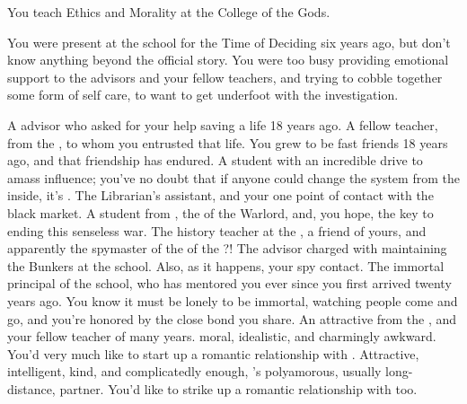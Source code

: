\documentclass[char]{GL2020}
\begin{document}
\begin{itemz}[Notes]
	\item You teach Ethics and Morality at the College of the Gods.
	\item You were present at the school for the Time of Deciding six years ago, but don't know anything beyond the official story. You were too busy providing emotional support to the advisors and your fellow teachers, and trying to cobble together some form of self care, to want to get underfoot with the investigation.
\end{itemz}

\begin{contacts}
	\contact{\cEvil{}} A \pFarm{} advisor who asked for your help saving a life 18 years ago.
\contact{\cPirate{}} A fellow teacher, from the \pShip{}, to whom you entrusted that life. You grew to be fast friends 18 years ago, and that friendship has endured.
\contact{\cAmbition{}} A \pTech{} student with an incredible drive to amass influence; you've no doubt that if anyone could change the system from the inside, it's \cAmbition{}.
	\contact{\cLibAssist{}} The Librarian's assistant, and your one point of contact with the black market.
	\contact{\cWarlordDaughter{}} A student from \pShip{}, the \cWarlordDaughter{\child} of the Warlord, and, you hope, the key to ending this senseless war.
	\contact{\cHistory{}} The history teacher at the \pSc{}, a friend of yours, and apparently the spymaster of the \cQueen{\Majesty} of the \pFarm{}?!
	\contact{\cBunker{}} The advisor charged with maintaining the Bunkers at the school. Also, as it happens, your \pShip{} spy contact.
	\contact{\cPrincipal{}} The immortal principal of the school, who has mentored you ever since you first arrived twenty years ago. You know it must be lonely to be immortal, watching people come and go, and you're honored by the close bond you share.
	\contact{\cBeetle{}} An attractive \cBeetle{\cleric} from the \pTech{}, and your fellow teacher of many years. \cBeetle{\Theyare} moral, idealistic, and charmingly awkward. You'd very much like to start up a romantic relationship with \cBeetle{\them}.
	\contact{\cJuniorStatesman{}} Attractive, intelligent, kind, and complicatedly enough, \cBeetle{}'s polyamorous, usually long-distance, partner. You'd like to strike up a romantic relationship with \cJuniorStatesman{\them} too.
\end{contacts}
\end{document}
